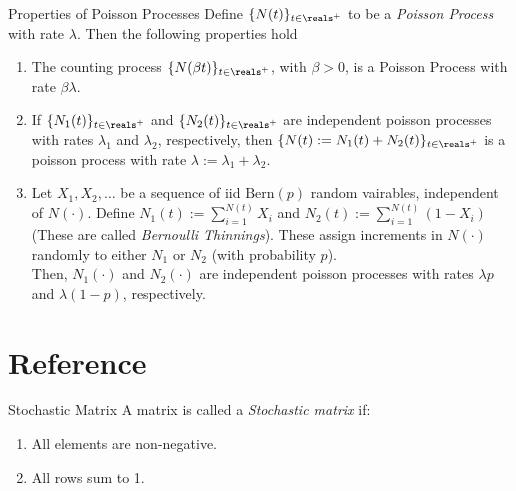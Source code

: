 \documentclass[11pt,a4paper]{article}
\begin{document}
\begin{proposition}{Properties of Poisson Processes}
  Define $\{N(t)\}_{t\in\reals^+}$ to be a \textit{Poisson Process} with rate $\lambda$. Then the following properties hold
  \begin{enumerate}
    \item The counting process $\{N(\beta t)\}_{t\in\reals^+}$, with $\beta>0$, is a Poisson Process with rate $\beta\lambda$.
    \item If $\{N_1(t)\}_{t\in\reals^+}$ and $\{N_2(t)\}_{t\in\reals^+}$ are independent poisson processes with rates $\lambda_1$ and $\lambda_2$, respectively, then $\{N(t):=N_1(t)+N_2(t)\}_{t\in\reals^+}$ is a poisson process with rate $\lambda:=\lambda_1+\lambda_2$.
    \item Let $X_1,X_2,\dots$ be a sequence of iid $\text{Bern}(p)$ random vairables, independent of $N(\cdot)$. Define $N_1(t):=\sum_{i=1}^{N(t)}X_i$ and $N_2(t):=\sum_{i=1}^{N(t)}(1-X_i)$ (These are called \textit{Bernoulli Thinnings}). These assign increments in $N(\cdot)$ randomly to either $N_1$ or $N_2$ (with probability $p$).\\
    Then, $N_1(\cdot)$ and $N_2(\cdot)$ are independent poisson processes with rates $\lambda p$ and $\lambda(1-p)$, respectively.
  \end{enumerate}
\end{proposition}

\newpage
\setcounter{section}{-1}
\section{Reference}

\begin{definition}{Stochastic Matrix}
  A matrix is called a \textit{Stochastic matrix} if:
  \begin{enumerate}
    \item All elements are non-negative.
    \item All rows sum to 1.
  \end{enumerate}
\end{definition}
\end{document}
